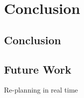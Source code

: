 \chapter{Conclusion} \label{chap:conc}

\section{Conclusion}

\section{Future Work}

Re-planning in real time 